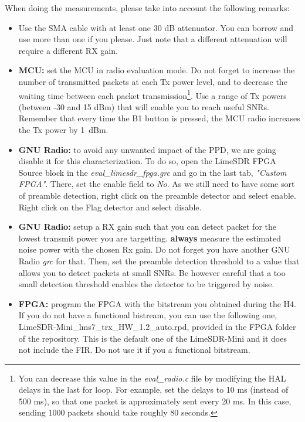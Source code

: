 When doing the measurements, please take into account the following remarks:
\begin{itemize}
    \item Use the SMA cable with at least one 30 dB attenuator. You can borrow and use more than one if you please. Just note that a different attenuation will require a different RX gain.
    \item \textbf{MCU:} set the MCU in radio evaluation mode. Do not forget to increase the number of transmitted packets at each Tx power level, and to decrease the waiting time between each packet transmission\footnote{You can decrease this value in the \textit{eval\_radio.c} file by modifying the HAL delays in the last for loop. For example, set the delays to 10 ms (instead of 500 ms), so that one packet is approximately sent every 20 ms. In this case, sending 1000 packets should take roughly 80 seconds.}. Use a range of Tx powers (between -30 and 15 dBm) that will enable you to reach useful SNRs. Remember that every time the B1 button is pressed, the MCU radio increases the Tx power by 1~dBm.
    \item \textbf{GNU Radio:} to avoid any unwanted impact of the PPD, we are going disable it for this characterization. To do so, open the LimeSDR FPGA Source block in the \textit{eval\_limesdr\_fpga.grc} and go in the last tab, \textit{"Custom FPGA"}. There, set the enable field to \textit{No}. As we still need to have some sort of preamble detection, right click on the preamble detector and select enable. Right click on the Flag detector and  select disable.
    \item \textbf{GNU Radio:} setup a RX gain such that you can detect packet for the lowest transmit power you are targetting. \textbf{always} measure the estimated noise power with the chosen Rx gain. Do not forget you have another GNU Radio \textit{grc} for that. Then, set the preamble detection threshold to a value that allows you to detect packets at small SNRs. Be however careful that a too small detection threshold enables the detector to be triggered by noise.
    \item \textbf{FPGA:} program the FPGA with the bitstream you obtained during the H4. If you do not have a functional bistream, you can use the following one, {LimeSDR-Mini\_lms7\_trx\_HW\_1.2\_auto.rpd}, provided in the FPGA folder of the repository. This is the default one of the LimeSDR-Mini and it does not include the FIR. Do not use it if you a functional bitstream.
\end{itemize}

